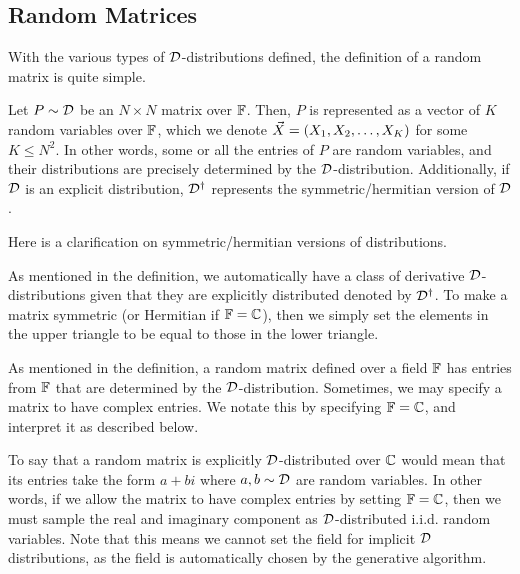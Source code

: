 \newpage
\subsection{Random Matrices}

With the various types of $\D$-distributions defined, the definition of a random matrix is quite simple.

\begin{definition}
Let $P \sim \D$ be an $N \times N$ matrix over $\F$.
Then, $P$ is represented as a vector of $K$ random variables over $\F$, which we denote $\vec{X} = (\seqo[K]{X})$ for some $K \leq N^2$.
In other words, some or all the entries of $P$ are random variables, and their distributions are precisely determined by the $\D$-distribution.
Additionally, if $\D$ is an explicit distribution, $\D^\dagger$ represents the symmetric/hermitian version of $\D$.
\end{definition}

Here is a clarification on symmetric/hermitian versions of distributions.

\begin{remark}
As mentioned in the definition, we automatically have a class of derivative $\D$-distributions given that they are explicitly distributed denoted by $\D^\dagger$. To make a matrix symmetric
(or Hermitian if $\F = \C$), then we simply set the elements in the upper triangle to be equal to those in the lower triangle.
\end{remark}

As mentioned in the definition, a random matrix defined over a field $\F$ has entries from $\F$ that are determined by the $\D$-distribution.
Sometimes, we may specify a matrix to have complex entries. We notate this by specifying $\F = \Cc$, and interpret it as described below.

\begin{remark}
To say that a random matrix is explicitly $\D$-distributed over $\Cc$ would mean that its entries take the form $a + bi$ where $a,b \sim \D$ are random variables.
In other words, if we allow the matrix to have complex entries by setting $\F = \Cc$, then we must sample the real and imaginary component as $\D$-distributed i.i.d. random variables.
Note that this means we cannot set the field for implicit $\D$ distributions, as the field is automatically chosen by the generative algorithm.
\end{remark}

